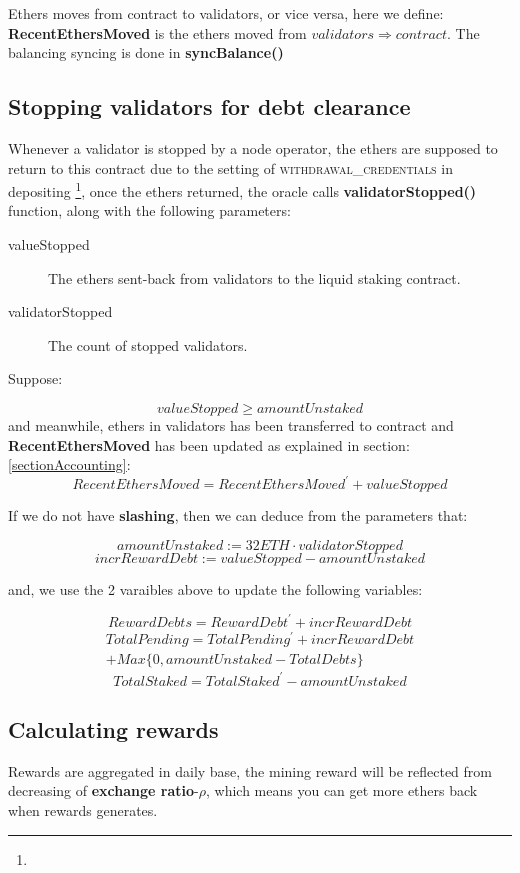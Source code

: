 \documentclass{article}
\begin{document}
Ethers moves from contract to validators, or vice versa, here we define: \textbf{RecentEthersMoved} is the ethers moved from ${validators}\Longrightarrow{contract}$. The balancing syncing is done in \textbf{syncBalance()}

\subsection{Stopping validators for debt clearance}
Whenever a validator is stopped by a node operator, the ethers are supposed to return to this contract due to the setting of \textsc{withdrawal\_credentials} in depositing \footnote{}, once the ethers returned, the oracle calls \textbf{validatorStopped()} function, along with the following parameters:
\begin{description}
\item[valueStopped] The ethers sent-back from validators to the liquid staking contract.
\item[validatorStopped] The count of stopped validators.
\end{description}
Suppose:

\[valueStopped \geq amountUnstaked \]
and meanwhile, ethers in validators has been transferred to contract and \textbf{RecentEthersMoved} has been updated as explained in section:\ref{sectionAccounting}:
\[RecentEthersMoved = RecentEthersMoved^{\prime} + valueStopped\]

If we do not have \textbf{slashing}, then we can deduce from the parameters that:
\begin{lemma}
\[amountUnstaked := 32 ETH \cdot validatorStopped\]
\[incrRewardDebt := valueStopped - amountUnstaked\]
\end{lemma}

and, we use the 2 varaibles above to update the following variables:
\begin{theorem}
\label{validatorStopped}
\[RewardDebts = RewardDebt^{\prime} + incrRewardDebt\]
\begin{multline}
TotalPending = TotalPending^{\prime} + incrRewardDebt \\
+ Max\{0, amountUnstaked - TotalDebts\}
\end{multline}
\[TotalStaked = TotalStaked^{\prime} -  amountUnstaked \]
\end{theorem}

\subsection{Calculating rewards}
Rewards are aggregated in daily base, the mining reward will be reflected from decreasing of \textbf{exchange ratio}-$\rho$, which means you can get more ethers back when rewards generates.
\end{document}
